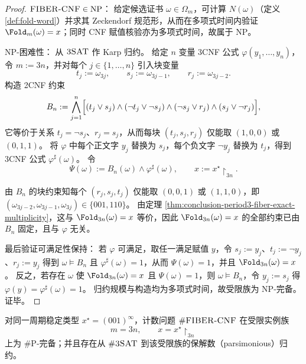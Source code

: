 \begin{proof}
\(\textsc{FIBER-CNF}\in\mathrm{NP}\)：
给定候选证书 \(\omega\in\Omega_m\)，可计算 \(N(\omega)\)（定义 \ref{def:fold-word}）并求其 Zeckendorf 规范形，从而在多项式时间内验证 \(\Fold_m(\omega)=x\)；同时 CNF 赋值核验亦为多项式时间，故属于 \(\mathrm{NP}\)。

\(\mathrm{NP}\)-困难性：
从 \(\textsc{3SAT}\) 作 Karp 归约。
给定 \(n\) 变量 3CNF 公式 \(\varphi(y_1,\dots,y_n)\)，令 \(m:=3n\)，并对每个 \(j\in\{1,\dots,n\}\) 引入块变量
\[
t_j:=\omega_{3j},\qquad s_j:=\omega_{3j-1},\qquad r_j:=\omega_{3j-2}.
\]
构造 2CNF 约束
\[
B_n
:=\bigwedge_{j=1}^{n}\Bigl[(t_j\vee s_j)\wedge(\neg t_j\vee\neg s_j)\wedge(\neg s_j\vee r_j)\wedge(s_j\vee\neg r_j)\Bigr],
\]
它等价于关系 \(t_j=\neg s_j\)、\(r_j=s_j\)，从而每块 \((t_j,s_j,r_j)\) 仅能取 \((1,0,0)\) 或 \((0,1,1)\)。
将 \(\varphi\) 中每个正文字 \(y_j\) 替换为 \(s_j\)，每个负文字 \(\neg y_j\) 替换为 \(t_j\)，得到 3CNF 公式 \(\varphi^\sharp(\omega)\)。
令
\[
\Psi(\omega):=B_n(\omega)\wedge \varphi^\sharp(\omega),
\qquad
x:=x^\star\!\upharpoonright_{3n}.
\]

由 \(B_n\) 的块约束知每个 \((r_j,s_j,t_j)\) 仅能取 \((0,0,1)\) 或 \((1,1,0)\)，即
\(
(\omega_{3j-2},\omega_{3j-1},\omega_{3j})\in\{001,110\}
\)。
由定理 \ref{thm:conclusion-period3-fiber-exact-multiplicity}，这与 \(\Fold_{3n}(\omega)=x\) 等价，因此 \(\Fold_{3n}(\omega)=x\) 的全部约束已由 \(B_n\) 固定，且与 \(\varphi\) 无关。

最后验证可满足性保持：
若 \(\varphi\) 可满足，取任一满足赋值 \(y\)，令 \(s_j:=y_j\)、\(t_j:=\neg y_j\)、\(r_j:=y_j\) 得到 \(\omega\models B_n\) 且 \(\varphi^\sharp(\omega)=1\)，从而 \(\Psi(\omega)=1\)，并且 \(\Fold_{3n}(\omega)=x\)。
反之，若存在 \(\omega\) 使 \(\Fold_{3n}(\omega)=x\) 且 \(\Psi(\omega)=1\)，则 \(\omega\models B_n\)，令 \(y_j:=s_j\) 得 \(\varphi(y)=\varphi^\sharp(\omega)=1\)。
归约规模与构造均为多项式时间，故受限族为 \(\mathrm{NP}\)-完备。证毕。
\end{proof}

\begin{theorem}\label{thm:conclusion-sharp-fiber-cnf-sharpPcomplete-parsimonious}
对同一周期稳定类型 \(x^\star=(001)^\infty\)，计数问题 \(\#\text{\normalfont\textsc{FIBER-CNF}}\) 在受限实例族
\[
m=3n,\qquad x=x^\star\!\upharpoonright_{3n}
\]
上为 \(\#\mathrm{P}\)-完备；并且存在从 \(\#\text{\normalfont\textsc{3SAT}}\) 到该受限族的保解数（parsimonious）归约。
\end{theorem}

